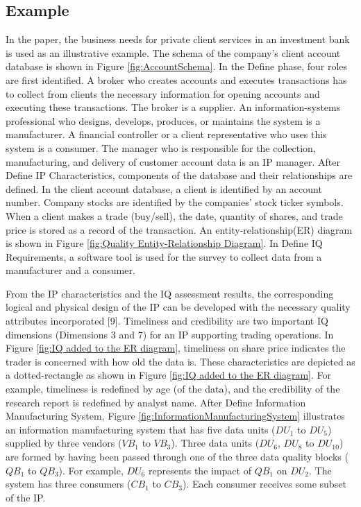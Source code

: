 \documentclass[pdftex,english,oribibl]{llncs}
\begin{document}
\subsection{Example}

In the paper, the business needs for private client services in an investment bank is used as an illustrative example. The schema of the company's client account database is shown in Figure \ref{fig:AccountSchema}.
In the Define phase, four roles are first identified. A broker who creates accounts and executes transactions has to collect from
clients the necessary information for opening accounts and executing these transactions.
The broker is a supplier. An information-systems professional who designs, develops, produces, or maintains the system is a manufacturer. A financial controller or a client representative who uses this system is a consumer. The manager who is responsible for the collection, manufacturing, and delivery of customer account data is an IP manager. After Define IP Characteristics, components of the database and their relationships are defined.
In the client account database, a client is identified by an
account number. Company stocks are identified by the
companies' stock ticker symbols. When a client makes
a trade (buy/sell), the date, quantity of shares, and trade
price is stored as a record of the transaction. An entity-relationship(ER) diagram is shown in Figure \ref{fig:Quality Entity-Relationship Diagram}. In Define IQ Requirements, a software tool is used for the survey to collect data from a manufacturer and a consumer.

From the IP characteristics and the IQ assessment
results, the corresponding logical and physical design of
the IP can be developed with the necessary quality
attributes incorporated [9]. Timeliness and credibility
are two important IQ dimensions (Dimensions 3 and 7)
for an IP supporting trading operations. In Figure \ref{fig:IQ added to the ER diagram},
timeliness on share price indicates the trader is concerned with how old the data is. These characteristics are depicted as a dotted-rectangle as shown in Figure \ref{fig:IQ added to the ER diagram}. For example, timeliness is redefined by age
(of the data), and the credibility of the research report is
redefined by analyst name.
After Define Information Manufacturing System, Figure \ref{fig:InformationManufacturingSystem} illustrates an
information manufacturing system that has five data units ($DU_{1}$ to $DU_{5}$) supplied by three vendors
($VB_{1}$ to $VB_{3}$). Three data units ($DU_{6}$, $DU_{8}$ to $DU_{10}$) are
formed by having been passed through one of the three
data quality blocks ($QB_{1}$ to $QB_{3}$). For example, $DU_{6}$ represents the impact of $QB_{1}$ on $DU_{2}$. The system has three consumers
($CB_{1}$ to $CB_{3}$). Each consumer receives some subset of the IP.
\end{document}
